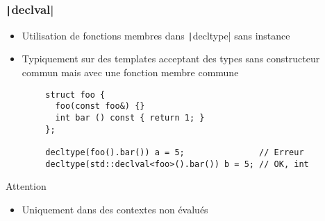\documentclass[C++.tex]{subfiles}
\begin{document}
\begin{frame}[fragile]
	\frametitle{\texttt|declval|}
	\begin{itemize}
		\item Utilisation de fonctions membres dans \texttt|decltype| sans instance
		\item Typiquement sur des templates acceptant des types sans constructeur commun mais avec une fonction membre commune
	\end{itemize}

	\begin{verbatim}
		struct foo {
		  foo(const foo&) {}
		  int bar () const { return 1; }
		};

		decltype(foo().bar()) a = 5;               // Erreur
		decltype(std::declval<foo>().bar()) b = 5; // OK, int
	\end{verbatim}

	\begin{alertblock}{Attention}
		\begin{itemize}
			\item Uniquement dans des contextes non évalués
		\end{itemize}
	\end{alertblock}

\end{frame}
\end{document}

